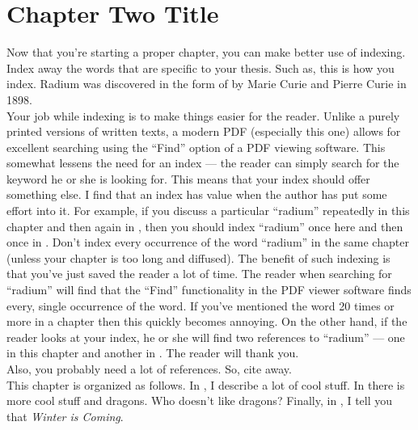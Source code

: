 
\chapter{Chapter Two Title}
\label{chap:chaptertwoname}
\doublespacing

Now that you're starting a proper chapter, you can make better use of
indexing. Index away the words that are specific to your thesis. Such as,
this is how you index. Radium was discovered in the form of
 by Marie Curie and Pierre Curie in 1898. \\

Your job while indexing is to make things easier for the reader.
Unlike a purely printed versions of written texts, a modern PDF
(especially this one) allows for excellent searching using the
``Find'' option of a PDF viewing software. This somewhat lessens the need
for an index --- the reader can simply search for the keyword he or she is
looking for. This means that your index should offer something else.
I find that an index has value when the author has put some effort into it.
For example, if you discuss a particular ``radium'' repeatedly in this chapter
and then again in \chapterfourname{}, then you should index ``radium'' once here and then
once in \chapterfourname{}. Don't index every occurrence of the word ``radium''
in the same chapter (unless your chapter is too long and diffused). The benefit
of such indexing is that you've just saved the reader a lot of time. The reader when
searching for ``radium'' will find that the ``Find'' functionality in the PDF viewer
software finds every, single occurrence of the word. If you've mentioned the word
20 times or more in a chapter then this quickly becomes annoying. On the other hand,
if the reader looks at your index, he or she will find two references to ``radium'' --- one
in this chapter and another in \chapterfourname{}. The reader will thank you. \\

Also, you probably need a lot of references. So, cite away. \\

This chapter is organized as follows. In , I describe
a lot of cool stuff. In  there is more cool stuff and
dragons. Who doesn't like dragons? Finally, in ,
I tell you that \emph{Winter is Coming}. \\

